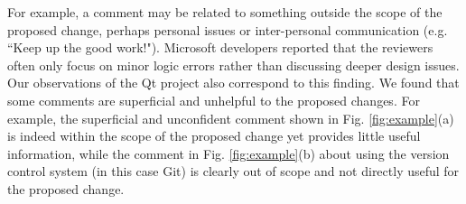 
For example, a comment may be related to something outside the scope of the proposed change, perhaps personal issues or inter-personal communication (e.g. ``Keep up the good work!").
Microsoft developers reported that the reviewers often only focus on minor logic errors rather than discussing deeper design\cite{Bacchelli2013a} issues.
Our observations of the Qt project also correspond to this finding.
We found that some comments are superficial and unhelpful to the proposed changes.
For example, the superficial and unconfident comment shown in Fig. \ref{fig:example}(a) is indeed within the scope of the proposed change yet provides little useful information,
while the comment in Fig. \ref{fig:example}(b) about using the version control system (in this case Git) is clearly out of scope and not directly useful for the proposed change. 



